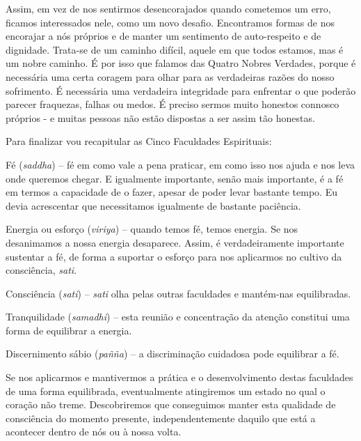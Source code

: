 Assim, em vez de nos sentirmos desencorajados quando cometemos um erro,
ficamos interessados nele, como um novo desafio. Encontramos formas de
nos encorajar a nós próprios e de manter um sentimento de auto-respeito
e de dignidade. Trata-se de um caminho difícil, aquele em que todos
estamos, mas é um nobre caminho. É por isso que falamos das Quatro
Nobres Verdades, porque é necessária uma certa coragem para olhar para
as verdadeiras razões do nosso sofrimento. É necessária uma verdadeira
integridade para enfrentar o que poderão parecer fraquezas, falhas ou
medos. É preciso sermos muito honestos connosco próprios - e muitas
pessoas não estão dispostas a ser assim tão honestas.

Para finalizar vou recapitular as Cinco Faculdades Espirituais:

{\itshape

Fé (\emph{saddha}) -- fé em como vale a pena praticar, em como isso nos ajuda
e nos leva onde queremos chegar. E igualmente importante, senão mais
importante, é a fé em termos a capacidade de o fazer, apesar de poder levar
bastante tempo. Eu devia acrescentar que necessitamos igualmente de bastante
paciência.

Energia ou esforço (\emph{viriya}) -- quando temos fé, temos energia. Se nos
desanimamos a nossa energia desaparece. Assim, é verdadeiramente importante
sustentar a fé, de forma a suportar o esforço para nos aplicarmos no cultivo
da consciência, \emph{sati}.

Consciência (\emph{sati}) -- \emph{sati} olha pelas outras faculdades e
mantém-nas equilibradas.

Tranquilidade (\emph{samadhi}) -- esta reunião e concentração da atenção
constitui uma forma de equilibrar a energia.

Discernimento sábio (\emph{pañña}) -- a discriminação cuidadosa pode
equilibrar a fé.

}

Se nos aplicarmos e mantivermos a prática e o desenvolvimento destas
faculdades de uma forma equilibrada, eventualmente atingiremos um estado
no qual o coração não treme. Descobriremos que conseguimos manter esta
qualidade de consciência do momento presente, independentemente daquilo
que está a acontecer dentro de nós ou à nossa volta.

